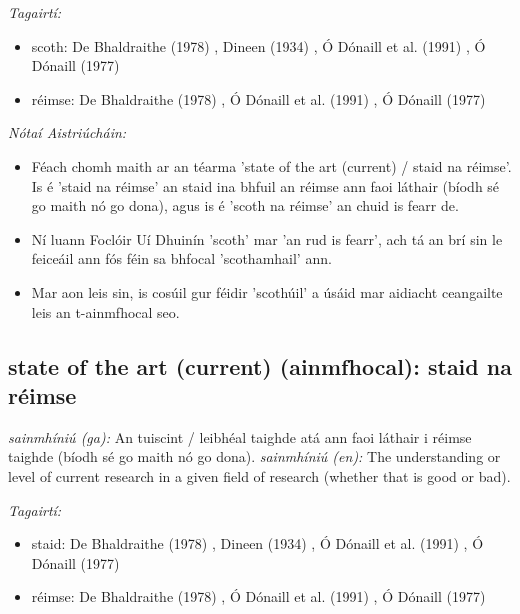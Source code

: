 \documentclass{article}
\begin{document}
 \noindent \textit{Tagairtí:}
\begin{itemize}
	\item scoth: De Bhaldraithe (1978) \cite{de-bhaldraithe}, Dineen (1934) \cite{dineen}, Ó Dónaill et al. (1991) \cite{focloir-beag}, Ó Dónaill (1977) \cite{odonaill}
	\item réimse: De Bhaldraithe (1978) \cite{de-bhaldraithe}, Ó Dónaill et al. (1991) \cite{focloir-beag}, Ó Dónaill (1977) \cite{odonaill}
\end{itemize}

 \noindent \textit{Nótaí Aistriúcháin:}
\begin{itemize}
	\item Féach chomh maith ar an téarma 'state of the art (current) / staid na réimse'. Is é 'staid na réimse' an staid ina bhfuil an réimse ann faoi láthair (bíodh sé go maith nó go dona), agus is é 'scoth na réimse' an chuid is fearr de.
	\item Ní luann Foclóir Uí Dhuinín 'scoth' mar 'an rud is fearr', ach tá an brí sin le feiceáil ann fós féin sa bhfocal 'scothamhail' ann.
	\item Mar aon leis sin, is cosúil gur féidir 'scothúil' a úsáid mar aidiacht ceangailte leis an t-ainmfhocal seo.
\end{itemize}


\subsection*{state of the art (current) (ainmfhocal): staid na réimse} 
 \noindent \textit{sainmhíniú (ga):} An tuiscint / leibhéal taighde atá ann faoi láthair i réimse taighde (bíodh sé go maith nó go dona).
\newline\newline
 \noindent \textit{sainmhíniú (en):} The understanding or level of current research in a given field of research (whether that is good or bad).
\newline

 \noindent \textit{Tagairtí:}
\begin{itemize}
	\item staid: De Bhaldraithe (1978) \cite{de-bhaldraithe}, Dineen (1934) \cite{dineen}, Ó Dónaill et al. (1991) \cite{focloir-beag}, Ó Dónaill (1977) \cite{odonaill}
	\item réimse: De Bhaldraithe (1978) \cite{de-bhaldraithe}, Ó Dónaill et al. (1991) \cite{focloir-beag}, Ó Dónaill (1977) \cite{odonaill}
\end{itemize}
\end{document}
